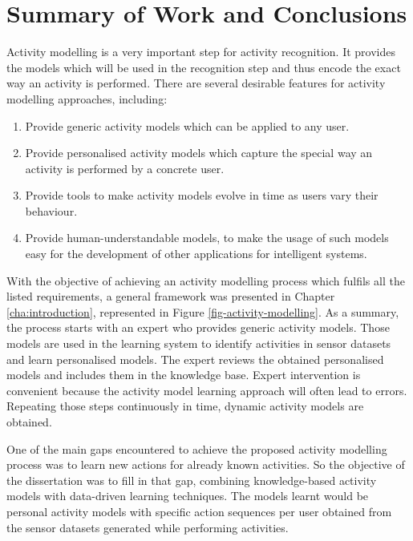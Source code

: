 \section{Summary of Work and Conclusions}
\label{sec:conclusions:conclusions}

Activity modelling is a very important step for activity recognition. It provides the models which will be used in the recognition step and thus encode the exact way an activity is performed. There are several desirable features for activity modelling approaches, including:

\begin{enumerate}
 \item Provide generic activity models which can be applied to any user.
 \item Provide personalised activity models which capture the special way an activity is performed by a concrete user.
 \item Provide tools to make activity models evolve in time as users vary their behaviour.
 \item Provide human-understandable models, to make the usage of such models easy for the development of other applications for intelligent systems.
\end{enumerate}

With the objective of achieving an activity modelling process which fulfils all the listed requirements, a general framework was presented in Chapter \ref{cha:introduction}, represented in Figure \ref{fig-activity-modelling}. As a summary, the process starts with an expert who provides generic activity models. Those models are used in the learning system to identify activities in sensor datasets and learn personalised models. The expert reviews the obtained personalised models and includes them in the knowledge base. Expert intervention is convenient because the activity model learning approach will often lead to errors. Repeating those steps continuously in time, dynamic activity models are obtained.

One of the main gaps encountered to achieve the proposed activity modelling process was to learn new actions for already known activities. So the objective of the dissertation was to fill in that gap, combining knowledge-based activity models with data-driven learning techniques. The models learnt would be personal activity models with specific action sequences per user obtained from the sensor datasets generated while performing activities.

